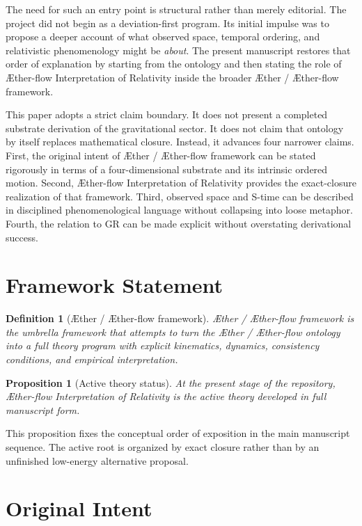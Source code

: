 \documentclass[11pt]{article}
\newcommand{\Aether}{\AE{}ther}
\newcommand{\Aflow}{\AE{}ther-flow}
\newcommand{\TheoryName}{\Aflow{} Interpretation of Relativity}
\newcommand{\TheoryProgram}{\Aether{} / \Aflow{} framework}
\newtheorem{definition}{Definition}
\newtheorem{proposition}{Proposition}
\begin{document}
The need for such an entry point is structural rather than merely editorial. The project did not begin as a deviation-first program. Its initial impulse was to propose a deeper account of what observed space, temporal ordering, and relativistic phenomenology might be \emph{about}. The present manuscript restores that order of explanation by starting from the ontology and then stating the role of \TheoryName{} inside the broader \TheoryProgram{}.

This paper adopts a strict claim boundary. It does not present a completed substrate derivation of the gravitational sector. It does not claim that ontology by itself replaces mathematical closure. Instead, it advances four narrower claims. First, the original intent of \TheoryProgram{} can be stated rigorously in terms of a four-dimensional substrate and its intrinsic ordered motion. Second, \TheoryName{} provides the exact-closure realization of that framework. Third, observed space and S-time can be described in disciplined phenomenological language without collapsing into loose metaphor. Fourth, the relation to GR can be made explicit without overstating derivational success.

\section{Framework Statement}

\begin{definition}[\TheoryProgram{}]
\TheoryProgram{} is the umbrella framework that attempts to turn the \Aether{} / \Aflow{} ontology into a full theory program with explicit kinematics, dynamics, consistency conditions, and empirical interpretation.
\end{definition}

\begin{proposition}[Active theory status]
At the present stage of the repository, \TheoryName{} is the active theory developed in full manuscript form.
\end{proposition}

This proposition fixes the conceptual order of exposition in the main manuscript sequence. The active root is organized by exact closure rather than by an unfinished low-energy alternative proposal.

\section{Original Intent}
\end{document}
